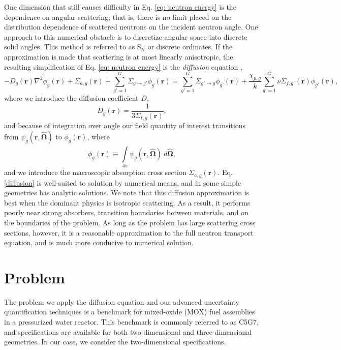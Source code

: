 One dimension that still causes difficulty in Eq. \ref{eq: neutron energy} is the dependence on angular
scattering; that is, there is no limit placed on the distribution dependence of scattered neutrons on the
incident neutron angle.  One approach to this numerical obstacle is to discretize angular space into discrete
solid angles.  This method is referred to as S$_\text{N}$ or discrete ordinates.  If the approximation
is made that scattering is at most linearly anisotropic, the resulting simplification of Eq. \ref{eq: neutron energy}
is the \emph{diffusion} equation \cite{duderstadt},
\begin{equation}\label{eq:diffusion}
  -D_g(\mathbf{r})\nabla^2\phi_g(\mathbf{r}) + \Sigma_{a,g}(\mathbf{r}) + \sum_{g'=1}^G \Sigma_{g\to g'}\phi_g(\mathbf{r}) =
  \sum_{g'=1}^G \Sigma_{g'\to g}\phi_{g'}(\mathbf{r}) + 
  \frac{\chi_{p,g}}{k}\sum_{g'=1}^G \nu\Sigma_{f,g'}(\mathbf{r})\phi_{g'}(\mathbf{r}),
\end{equation}
where we introduce the diffusion coefficient $D$,
\begin{equation}
  D_g(\mathbf{r}) = \frac{1}{3\Sigma_{t,g}(\mathbf{r})},
\end{equation}
and because of integration over angle our field quantity of interest transitions from
$\psi_g(\mathbf{r},\mathbf{\hat\Omega})$ to $\phi_g(\mathbf{r})$, where
\begin{equation}
  \phi_g(\mathbf{r}) \equiv \int\limits_{4\pi}^{} \psi_g(\mathbf{r},\mathbf{\hat\Omega})\
  d\mathbf{\hat\Omega},
\end{equation}
and we introduce the macroscopic absorption cross section $\Sigma_{a,g}(\mathbf{r})$.  Eq. \ref{diffusion} is
well-suited to solution by numerical means, and in some simple geometries has analytic solutions.  We note
that this diffusion approximation is best when the dominant physics is isotropic scattering.  As a result, it
performs poorly near strong absorbers, transition boundaries between materials, and on the boundaries of the
problem.  As long as the problem has large scattering cross sections, however, it is a reasonable
approximation to the full neutron transport equation, and is much more conducive to numerical solution.

\section{Problem}
The problem we apply the diffusion equation and our advanced uncertainty quantification techniques is a
benchmark for mixed-oxide (MOX) fuel assemblies in a pressurized water reactor.  This benchmark \cite{c5g7} is
commonly referred to as C5G7, and specifications are available for both two-dimensional and three-dimensional
geometries.  In our case, we consider the two-dimensional specifications.

